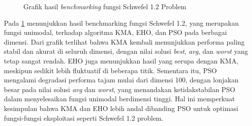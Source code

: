 \begin{figure}[H]
\caption{Grafik hasil \textit{benchmarking} fungsi Schwefel 1.2 Problem}
\label{fig:graph_schwefel_1_2}
\end{figure}

Pada \cref{fig:graph_schwefel_1_2} menunjukkan hasil benchmarking fungsi Schwefel 1.2, yang merupakan fungsi unimodal, terhadap algoritma KMA, EHO, dan PSO pada berbagai dimensi. Dari grafik terlihat bahwa KMA kembali menunjukkan performa paling stabil dan akurat di seluruh dimensi, dengan nilai solusi \textit{best}, \textit{avg}, dan \textit{worst} yang tetap sangat rendah. EHO juga menunjukkan hasil yang serupa dengan KMA, meskipun sedikit lebih fluktuatif di beberapa titik. Sementara itu, PSO mengalami degradasi performa tajam mulai dari dimensi 100, dengan lonjakan besar pada nilai solusi \textit{avg} dan \textit{worst}, yang menandakan ketidakstabilan PSO dalam menyelesaikan fungsi unimodal berdimensi tinggi. Hal ini memperkuat kesimpulan bahwa KMA dan EHO lebih andal dibanding PSO untuk optimasi fungsi-fungsi eksploitasi seperti Schwefel 1.2 problem.

